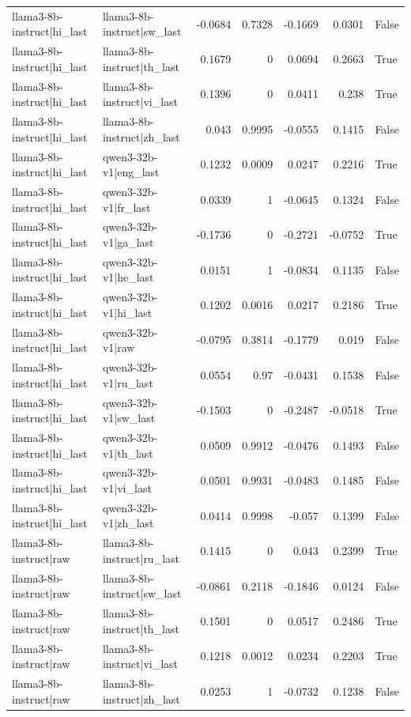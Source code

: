 \begin{table}
\begin{tabular}{l l r r r r l}
llama3-8b-instruct|hi_last & llama3-8b-instruct|sw_last & -0.0684 & 0.7328 & -0.1669 & 0.0301 & False \\
llama3-8b-instruct|hi_last & llama3-8b-instruct|th_last & 0.1679 & 0 & 0.0694 & 0.2663 & True \\
llama3-8b-instruct|hi_last & llama3-8b-instruct|vi_last & 0.1396 & 0 & 0.0411 & 0.238 & True \\
llama3-8b-instruct|hi_last & llama3-8b-instruct|zh_last & 0.043 & 0.9995 & -0.0555 & 0.1415 & False \\
llama3-8b-instruct|hi_last & qwen3-32b-v1|eng_last & 0.1232 & 0.0009 & 0.0247 & 0.2216 & True \\
llama3-8b-instruct|hi_last & qwen3-32b-v1|fr_last & 0.0339 & 1 & -0.0645 & 0.1324 & False \\
llama3-8b-instruct|hi_last & qwen3-32b-v1|ga_last & -0.1736 & 0 & -0.2721 & -0.0752 & True \\
llama3-8b-instruct|hi_last & qwen3-32b-v1|he_last & 0.0151 & 1 & -0.0834 & 0.1135 & False \\
llama3-8b-instruct|hi_last & qwen3-32b-v1|hi_last & 0.1202 & 0.0016 & 0.0217 & 0.2186 & True \\
llama3-8b-instruct|hi_last & qwen3-32b-v1|raw & -0.0795 & 0.3814 & -0.1779 & 0.019 & False \\
llama3-8b-instruct|hi_last & qwen3-32b-v1|ru_last & 0.0554 & 0.97 & -0.0431 & 0.1538 & False \\
llama3-8b-instruct|hi_last & qwen3-32b-v1|sw_last & -0.1503 & 0 & -0.2487 & -0.0518 & True \\
llama3-8b-instruct|hi_last & qwen3-32b-v1|th_last & 0.0509 & 0.9912 & -0.0476 & 0.1493 & False \\
llama3-8b-instruct|hi_last & qwen3-32b-v1|vi_last & 0.0501 & 0.9931 & -0.0483 & 0.1485 & False \\
llama3-8b-instruct|hi_last & qwen3-32b-v1|zh_last & 0.0414 & 0.9998 & -0.057 & 0.1399 & False \\
llama3-8b-instruct|raw & llama3-8b-instruct|ru_last & 0.1415 & 0 & 0.043 & 0.2399 & True \\
llama3-8b-instruct|raw & llama3-8b-instruct|sw_last & -0.0861 & 0.2118 & -0.1846 & 0.0124 & False \\
llama3-8b-instruct|raw & llama3-8b-instruct|th_last & 0.1501 & 0 & 0.0517 & 0.2486 & True \\
llama3-8b-instruct|raw & llama3-8b-instruct|vi_last & 0.1218 & 0.0012 & 0.0234 & 0.2203 & True \\
llama3-8b-instruct|raw & llama3-8b-instruct|zh_last & 0.0253 & 1 & -0.0732 & 0.1238 & False \\

\end{tabular}
\end{table}
